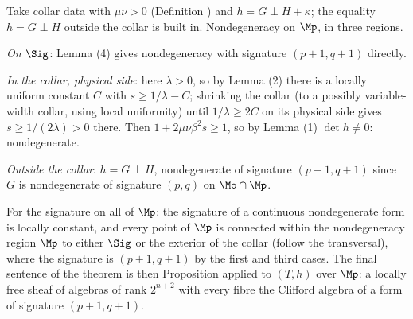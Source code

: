 Take collar data with $\mu\nu > 0$ (Definition ) and $h = G \perp H + \kappa$; the equality $h = G \perp H$ outside the collar is built in. Nondegeneracy on $\Mp$, in three regions.

\emph{On $\Sig$}: Lemma (4) gives nondegeneracy with signature $(p{+}1, q{+}1)$ directly.

\emph{In the collar, physical side}: here $\lambda > 0$, so by Lemma (2) there is a locally uniform constant $C$ with $s \geq 1/\lambda - C$; shrinking the collar (to a possibly variable-width collar, using local uniformity) until $1/\lambda \geq 2C$ on its physical side gives $s \geq 1/(2\lambda) > 0$ there. Then $1 + 2\mu\nu\beta^2 s \geq 1$, so by Lemma (1) $\det h \neq 0$: nondegenerate.

\emph{Outside the collar}: $h = G \perp H$, nondegenerate of signature $(p{+}1,q{+}1)$ since $G$ is nondegenerate of signature $(p,q)$ on $\Mo \cap \Mp$.

For the signature on all of $\Mp$: the signature of a continuous nondegenerate form is locally constant, and every point of $\Mp$ is connected within the nondegeneracy region $\Mp$ to either $\Sig$ or the exterior of the collar (follow the transversal), where the signature is $(p{+}1,q{+}1)$ by the first and third cases. The final sentence of the theorem is then Proposition  applied to $(T, h)$ over $\Mp$: a locally free sheaf of algebras of rank $2^{n+2}$ with every fibre the Clifford algebra of a form of signature $(p{+}1, q{+}1)$.
